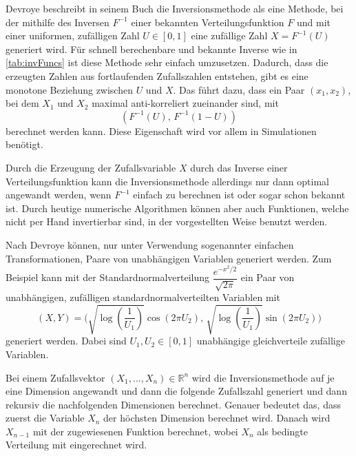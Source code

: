 Devroye \cite{devroye-non_uniform_random_variate-1986} beschreibt in seinem Buch die Inversionsmethode als eine 
Methode, bei der mithilfe des Inversen $F^{-1}$ einer bekannten Verteilungsfunktion $F$ und mit einer uniformen, 
zufälligen Zahl $U \in [0, 1]$ eine zufällige Zahl $X = F^{-1}(U)$ generiert wird. Für schnell berechenbare und 
bekannte Inverse wie in \ref{tab:invFuncs} ist diese Methode sehr einfach umzusetzen. Dadurch, dass die erzeugten 
Zahlen aus fortlaufenden Zufallszahlen entstehen, gibt es eine monotone Beziehung zwischen $U$ und $X$. Das führt 
dazu, dass ein Paar $(x_1, x_2)$, bei dem $X_1$ und $X_2$ maximal anti-korreliert zueinander sind, mit 
\begin{equation}
    (F^{-1}(U),\, F^{-1}(1 - U))
\end{equation}
berechnet werden kann. Diese Eigenschaft wird vor allem in Simulationen benötigt.

Durch die Erzeugung der Zufallsvariable $X$ durch das Inverse einer Verteilungsfunktion kann die Inversionsmethode 
allerdings nur dann optimal angewandt werden, wenn $F^{-1}$ einfach zu berechnen ist oder sogar schon bekannt ist. 
Durch heutige numerische Algorithmen können aber auch Funktionen, welche nicht \glqq per Hand\grqq{} invertierbar sind, in der 
vorgestellten Weise benutzt werden. 

Nach Devroye können, nur unter Verwendung sogenannter \glqq einfachen Transformationen\grqq, Paare von unabhängigen 
Variablen generiert werden. Zum Beispiel kann mit der Standardnormalverteilung $\dfrac{e^{-x^2/2}}{\sqrt{2\pi}}$ ein Paar von 
unabhängigen, zufälligen standardnormalverteilten Variablen mit 
\begin{equation}
    (X, Y) = \bigg( \sqrt{\log(\dfrac{1}{U_1})}\cos(2\pi U_2),\, \sqrt{\log(\dfrac{1}{U_1})}\sin(2\pi U_2) \bigg)
    \label{eq:stdnormdensity}
\end{equation}
generiert werden. Dabei sind $U_1, U_2 \in [0, 1]$ unabhängige gleichverteile zufällige Variablen.

Bei einem Zufallsvektor $ (X_1, ..., X_n) \in \mathbb{R}^n$ wird die Inversionsmethode auf je eine Dimension angewandt 
und dann die folgende Zufallszahl generiert und dann rekursiv die nachfolgenden Dimensionen berechnet. Genauer bedeutet das, 
dass zuerst die Variable $X_n$ der höchsten Dimension berechnet wird. Danach wird $X_{n-1}$ mit der zugewiesenen Funktion 
berechnet, wobei $X_n$ als bedingte Verteilung mit eingerechnet wird.


